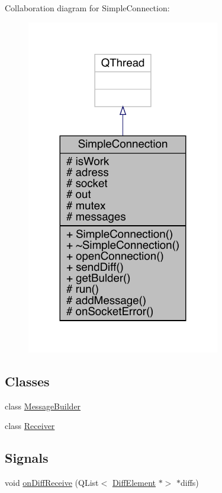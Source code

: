 Collaboration diagram for Simple\+Connection\+:
\nopagebreak
\begin{figure}[H]
\begin{center}
\leavevmode
\includegraphics[width=239pt]{de/d36/a00123}
\end{center}
\end{figure}
\subsection*{Classes}
\begin{DoxyCompactItemize}
\item 
class \hyperlink{a00129}{Message\+Builder}
\item 
class \hyperlink{a00133}{Receiver}
\end{DoxyCompactItemize}
\subsection*{Signals}
\begin{DoxyCompactItemize}
\item 
void \hyperlink{a00125_acd96d2282378dd8262c96604ede3715f}{on\+Diff\+Receive} (Q\+List$<$ \hyperlink{a00141}{Diff\+Element} $\ast$$>$ $\ast$diffs)
\end{DoxyCompactItemize}
